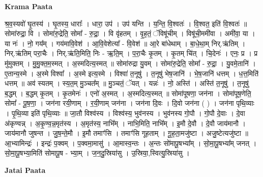 \documentclass[17pt]{extarticle}
\begin{document}
\textbf{Krama Paata} \newline

श्र॒व॒स्यवो॑ घृ॒तस्य॑ । घृ॒तस्य॒ धाराः᳚ । धारा॒ उप॑ । उप॑ यन्ति । य॒न्ति॒ वि॒श्वतः॑ । वि॒श्वत॒ इति॑ वि॒श्वतः॑ ॥ सोमा॑रुद्रा॒ वि । सोमा॑रु॒द्रेति॒ सोमा᳚ - रु॒द्रा॒ । वि वृ॑हतम् । वृ॒ह॒तं॒ ॅविषू॑चीम् । विषू॑ची॒ममी॑वा । अमी॑वा॒ या । या नः॑ । नो॒ गय᳚म् । गय॑मावि॒वेश॑ । आ॒वि॒वेशेत्या᳚ - वि॒वेश॑ ॥ आ॒रे बा॑धेथाम् । बा॒धे॒था॒म् निर्.ऋ॑तिम् । निर्.ऋ॑तिम् परा॒चैः । निर्.ऋ॑ति॒मिति॒ निः - ऋ॒ति॒म् । प॒रा॒चैः कृ॒तम् । कृ॒तम् चि॑त् । चि॒देनः॑ । एनः॒ प्र । प्र मु॑मुक्तम् । मु॒मु॒क्त॒म॒स्मत् । अ॒स्मदित्य॒स्मत् ॥ सोमा॑रुद्रा यु॒वम् । सोमा॑रु॒द्रेति॒ सोमा᳚ - रु॒द्रा॒ । यु॒वमे॒तानि॑ । ए॒तान्य॒स्मे । अ॒स्मे विश्वा᳚ । अ॒स्मे इत्य॒स्मे । विश्वा॑ त॒नूषु॑ । त॒नूषु॑ भेष॒जानि॑ । भे॒ष॒जानि॑ धत्तम् । ध॒त्त॒मिति॑ धत्तम् ॥ अव॑ स्यतम् । स्य॒त॒म् मु॒ञ्चत᳚म् ॥ मु॒ञ्चतं॒ ॅयत् । यन्नः॑ । नो॒ अस्ति॑ । अस्ति॑ त॒नूषु॑ । त॒नूषु॑ ब॒द्धम् । ब॒द्धम् कृ॒तम् । कृ॒तमेनः॑ । एनो॑ अ॒स्मत् । अ॒स्मदित्य॒स्मत् ॥ सोमा॑पूषणा॒ जन॑ना । सोमा॑पूष॒णेति॒ सोमा᳚ - पू॒ष॒णा॒ । जन॑ना रयी॒णाम् । र॒यी॒णाम् जन॑ना । जन॑ना दि॒वः । दि॒वो जन॑ना ( ) । जन॑ना पृथि॒व्याः । पृ॒थि॒व्या इति॑ पृथि॒व्याः ॥ जा॒तौ विश्व॑स्य । विश्व॑स्य॒ भुव॑नस्य । भुव॑नस्य गो॒पौ । गो॒पौ दे॒वाः । दे॒वा अ॑कृण्वन्न् । अ॒कृ॒ण्व॒न्न॒मृत॑स्य । अ॒मृत॑स्य॒ नाभि᳚म् । नाभि॒मिति॒ नाभि᳚म् । इ॒मौ दे॒वौ । दे॒वौ जाय॑मानौ । जाय॑मानौ जुषन्त । जु॒ष॒न्ते॒मौ । इ॒मौ तमाꣳ॑सि । तमाꣳ॑सि गूहताम् । गू॒ह॒ता॒मजु॑ष्टा । अजु॒ष्टेत्यजु॑ष्टा ॥ आ॒भ्यामिन्द्रः॑ । इन्द्रः॑ प॒क्वम् । प॒क्वमा॒मासु॑ । आ॒मास्व॒न्तः । अ॒न्तः सो॑मापू॒षभ्या᳚म् । सो॒मा॒पू॒षभ्या᳚म् जनत् । सो॒मा॒पू॒षभ्या॒मिति॑ सोमापू॒ष - भ्या॒म् । ज॒न॒दु॒स्रिया॑सु । उ॒स्रिया॒,स्वित्यु॒स्रिया॑सु । \newline

\textbf{Jatai Paata} \newline
\end{document}
